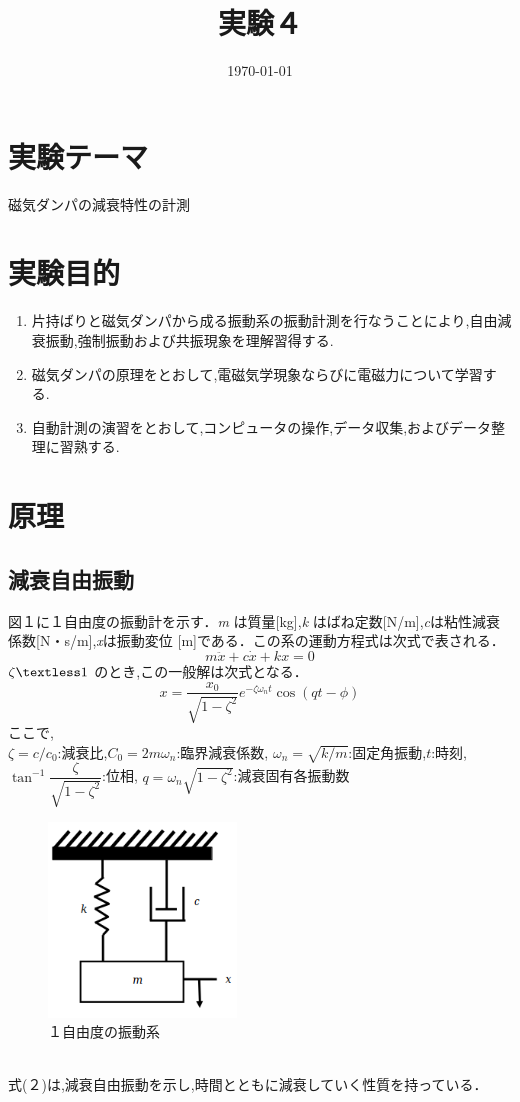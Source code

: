 \documentclass[a4paper,10.5pt]{jsarticle}
\title{実験４}
\author{\rightline{4s 30 野口 史遠}}
\date{\today}
\begin{document}
\section{実験テーマ}
磁気ダンパの減衰特性の計測

\section{実験目的}
\begin{enumerate}
  \item 片持ばりと磁気ダンパから成る振動系の振動計測を行なうことにより,自由減衰振動,強制振動および共振現象を理解習得する.
  \item 磁気ダンパの原理をとおして,電磁気学現象ならびに電磁力について学習する.
  \item 自動計測の演習をとおして,コンピュータの操作,データ収集,およびデータ整理に習熟する.
\end{enumerate}

\section{原理}
\subsection{減衰自由振動}
図１に１自由度の振動計を示す．\textsl{m} は質量[kg],\textsl{k}
はばね定数[N/m],\textsl{c}は粘性減衰係数[N・s/m],\textsl{x}は振動変位
[m]である．この系の運動方程式は次式で表される．
\begin{equation}
  m\ddot{x}+c\dot{x}+kx = 0
\end{equation}
$\zeta\textless1$ のとき,この一般解は次式となる．
\begin{equation}
x = {\dfrac{x_0}{\sqrt{1-\zeta^2}}e^{-\zeta {\omega}_{n} t}\cos (qt-\phi)}
\end{equation}
ここで,\\
\quad $\zeta=c/{c}_{0}$:減衰比,${C}_{0}=2m{\omega}_{n}$:臨界減衰係数,
$\omega_n=\sqrt{k/m}$:固定角振動,$t$:時刻,\\
\quad $\tan^{-1}{\dfrac{\zeta}{\sqrt{1-\zeta^2}}}$:位相,
$q=\omega_n\sqrt{1-\zeta^2}$:減衰固有各振動数
\begin{figure}[h]
  \centering
  \includegraphics[width=5cm]{1.png}
  \caption{１自由度の振動系}
\end{figure}  
\\式(２)は,減衰自由振動を示し,時間とともに減衰していく性質を持っている．
\end{document}
